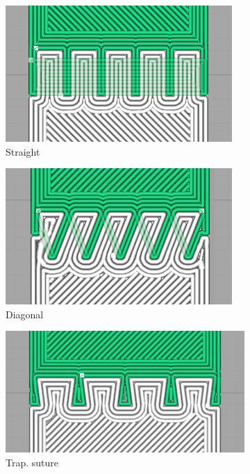 \begin{figure}
	\setlength{\figheight}{.4\columnwidth}
	\centering
	\begin{subfigure}[B]{.24\columnwidth}
		\centering
		\includegraphics[width=\figheight,rotate=90]{sources/testing/straight_gcode.jpg}
		\caption{Straight}
		\label{fig:gcode_straight}
	\end{subfigure}
	\begin{subfigure}[B]{.24\columnwidth}
		\centering
		\includegraphics[width=\figheight,rotate=90]{sources/testing/diagonal_gcode.jpg}
		\caption{Diagonal}
		\label{fig:gcode_diagonal}
	\end{subfigure}
	\begin{subfigure}[B]{.2\columnwidth}
		\centering
		\includegraphics[width=\figheight,rotate=90]{sources/testing/suture_gcode.jpg}
		\caption{Trap. suture}
		\label{fig:gcode_suture}
	\end{subfigure}
	\begin{subfigure}[B]{.2\columnwidth}
		\centering

\end{subfigure}
\end{figure}
